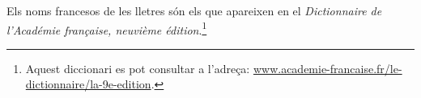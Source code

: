 Els noms francesos de les lletres són els que apareixen en el \textit{Dictionnaire de l'Académie française, neuvième édition}.\footnote{Aquest diccionari es pot consultar a l'adreça: \href{http://www.academie-francaise.fr/le-dictionnaire/la-9e-edition}{www.academie-francaise.fr/le-dictionnaire/la-9e-edition}.} 